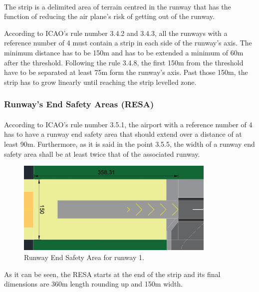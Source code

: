 			\paragraph{}The strip is a delimited area of terrain centred in the runway that has the function of reducing the air plane's risk of getting out of the runway.
			
			According to ICAO's rule number 3.4.2 and 3.4.3, all the runways with a reference number of 4 must contain a strip in each side of the runway's axis. The minimum distance has to be 150m and has to be extended a minimum of 60m after the threshold. 
			Following the rule 3.4.8, the first 150m from the threshold have to be separated at least 75m form the runway's axis. Past those 150m, the strip has to grow linearly until reaching the strip levelled zone.      
			
			\subsubsection{Runway's End Safety Areas (RESA)}
			\paragraph{}According to ICAO's rule number 3.5.1, the airport with a reference number of 4 has to have a runway end safety area that should extend over a distance of at least 90m. Furthermore, as it is said in the point 3.5.5, the width of a runway end safety area shall be at least twice that of the associated runway. 
			
			\begin{figure}[H]
				\centering
				\includegraphics[clip, trim=0cm 0cm 0cm 0cm, width=0.85\textwidth]{./images/declareddistances/RESA}
				\caption{Runway End Safety Area for runway 1.} %
				\label{} %
			\end{figure}
		
			As it can be seen, the RESA starts at the end of the strip and its final dimensions are 360m length rounding up and 150m width. 
			
